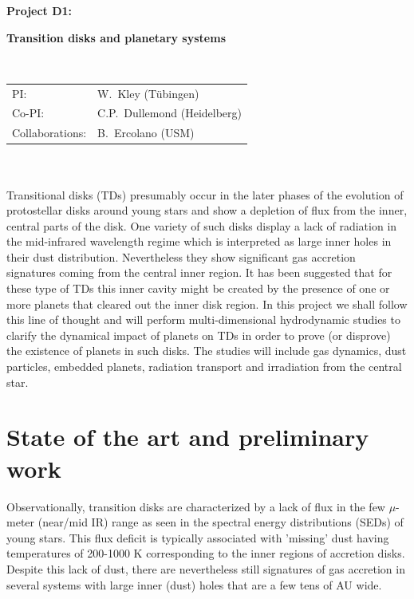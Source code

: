 \documentclass[10pt,fleqn,twoside]{article}
\begin{document}
\newpage


\setcounter{page}{1}

\centerline{\huge\bf\Tcol
%
%
%
%
%
 Project D1:}
\vspace{1em}

\centerline{\LARGE\bf\Tcol Transition disks and planetary systems}

%
%
%
%
%
\vskip1.0cm


\\
\begin{tabular}{ll}
{\textsf{PI:}}               & W.~Kley (T\"ubingen)\\
{\textsf{Co-PI:}}             & C.P.~Dullemond (Heidelberg)\\
{\textsf{Collaborations:}}     & B.~Ercolano (USM) \\
\end{tabular}


\vspace{1em}
 \\

\vspace{1em}
\\
Transitional disks (TDs) presumably occur in the later phases of the evolution of
protostellar disks around young stars and show a depletion of flux from the inner, central parts of the disk.
One variety of such disks display a lack of radiation in the mid-infrared wavelength regime which is interpreted
as large inner holes in their dust distribution.
Nevertheless they show significant gas accretion signatures coming from the central inner region. 
It has been suggested that for these type of TDs this inner cavity might be
created by the presence of one or more planets that cleared out the inner disk region.
In this project we shall follow this line of thought and will perform multi-dimensional hydrodynamic studies
to clarify the dynamical impact of planets on TDs in order to prove (or disprove) the existence of planets in such disks.
The studies will include gas dynamics, dust particles, embedded planets, radiation transport
and irradiation from the central star.

\section{State of the art and preliminary work}
\renewcommand{\leftmark}{\sc State of the Art and preliminary work}
Observationally, transition disks are characterized by a lack of
flux in the few $\mu$-meter (near/mid IR) range as seen in the spectral energy distributions
(SEDs) of young stars. This flux deficit is typically associated with
'missing' dust having temperatures of 200-1000 K 
\citep{2002ApJ...568.1008C,2005ApJ...621..461D}
corresponding to the inner regions of accretion disks. Despite this lack of dust,
there are nevertheless still signatures of gas accretion in several systems with large inner (dust) holes
that are a few tens of AU wide. 
\end{document}
